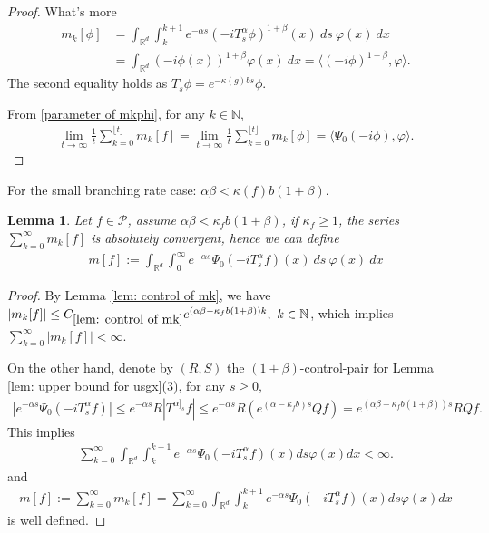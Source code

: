 \documentclass[12pt,oneside,english]{amsart}
\theoremstyle{plain}
\newtheorem{lem}[thm]{Lemma}
\theoremstyle{definition}
\numberwithin{equation}{section}
\newcommand{\added}[1]{{\color{blue}#1}}\newcommand{\deleted}[1]{{\color{red}#1}}
\begin{document}
\begin{proof}
    \deleted{
    What's more
    \begin{align*}
        m_k[\phi]&=\int_{\mathbb{R}^d}\int_k^{k+1} e^{-\alpha s}(-iT_{s}^{\alpha}\phi)^{1+\beta}(x)~ds~\varphi(x)~dx\\
        &=\int_{\mathbb{R}^d}(-i\phi(x))^{1+\beta}\varphi (x)~dx=\langle (-i\phi)^{1+\beta},\varphi\rangle.
    \end{align*}
    The second equality holds as $T_s\phi=e^{-\kappa(g)bs}\phi$.
    }
    
    From \eqref{parameter of mkphi}, for any $k\in \mathbb{N}$,
    \begin{align}
        \lim_{t\rightarrow \infty}\frac{1}{t}\sum_{k=0}^{\lfloor t\rfloor}m_k[f]=\lim_{t\rightarrow \infty}\frac{1}{t}\sum_{k=0}^{\lfloor t \rfloor}m_k[\phi]=\langle\Psi_0(-i\phi),\varphi\rangle.
    \end{align}
    
\end{proof}

\deleted {For the small branching rate case: $\alpha\beta<\kappa(f)b(1+\beta)$.}
\begin{lem}\label{lemma211}
Let $f\in \mathcal{P}$, assume $\alpha\beta<\kappa_fb(1+\beta)$, if $\kappa_f\geq 1$, the series $\sum_{k=0}^{\infty}m_k[f]$ is absolutely convergent, hence we can define
\begin{align}
    m[f]:=\int_{\mathbb{R}^d}\int_0^{\infty} e^{-\alpha s}\Psi_0(-iT_{s}^{\alpha}f)(x)~ds~\varphi(x)~dx \label{msmallcase}
\end{align}
\end{lem}
\begin{proof}
\added{
    By Lemma \ref{lem: control of mk}, we have $|m_k[f]|\leq C_{\ref{lem: control of mk}} e^{(\alpha\beta-\kappa_fb(1+\beta))k},~k\in\mathbb{N}$, which implies $\sum_{k=0}^{\infty}|m_k[f]|<\infty$. 
    
    On the other hand, denote by $(R,S)$ the $(1+\beta)$-control-pair for Lemma \ref{lem: upper bound for usgx}(3), for any $s\geq 0$,
    \begin{align}
        |e^{-\alpha s}\Psi_0(-iT_{s}^{\alpha}f)|\leq e^{-\alpha s}R|T^{\alpha]_s}f|\leq e^{-\alpha s}R(e^{(\alpha-\kappa_fb)s}Qf)=e^{(\alpha\beta-\kappa_fb(1+\beta))s}RQf.
    \end{align}
    This implies 
    \begin{align}
        \sum_{k=0}^{\infty}\int_{\mathbb{R}^d}\int_k^{k+1} e^{-\alpha s}\Psi_0(-iT_{s}^{\alpha}f)(x)ds\varphi(x)dx< \infty.
    \end{align}
    and
    \begin{align}
            m[f]:=\sum_{k=0}^{\infty}m_k[f]=\sum_{k=0}^{\infty}\int_{\mathbb{R}^d}\int_k^{k+1} e^{-\alpha s}\Psi_0(-iT_{s}^{\alpha}f)(x)ds\varphi(x)dx
    \end{align}
    is well defined.
    }
\end{proof}
\end{document}
